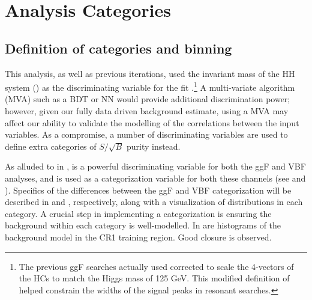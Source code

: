 \section{Analysis Categories}
\label{sec:category}

\subsection{Definition of categories and binning}
\label{subsec:cat-motivation}

This analysis, as well as previous iterations, used the invariant mass of the HH system (\mhh) as the discriminating variable for the fit \cite{EXOT-2016-31,ATLAS-CONF-2021-035,HDBS-2018-18-witherratum}.\footnote{The previous ggF searches actually used corrected \mhh to scale the 4-vectors of the HCs to match the Higgs mass of 125 GeV. This modified definition of \mhh helped constrain the widths of the signal peaks in resonant searches.} A multi-variate algorithm (MVA) such as a BDT or NN would provide additional discrimination power; however, given our fully data driven background estimate, using a MVA may affect our ability to validate the modelling of the correlations between the input variables.
As a compromise, a number of discriminating variables are used to define extra categories of $S / \sqrt{B}$ purity instead.

As alluded to in \Sect{\ref{sec:selection}}, \deta is a powerful discriminating variable for both the ggF and VBF analyses, and is used as a categorization variable for both these channels (see \Fig{\ref{fig:ggF-4b-deta-xhh-SR}} and \Fig{\ref{fig:vbf-detahh}}).
Specifics of the differences between the ggF and VBF categorization will be described in \Sect{\ref{subsubsec:ggF-cats}} and \Sect{\ref{subsubsec:VBF-cats}}, respectively, along with a visualization of \mhh distributions in each category.
A crucial step in implementing a categorization is ensuring the background within each category is well-modelled. In \Sect{\ref{sec:cats-CR1-validation}} are histograms of the background model in the CR1 training region. Good closure is observed.

